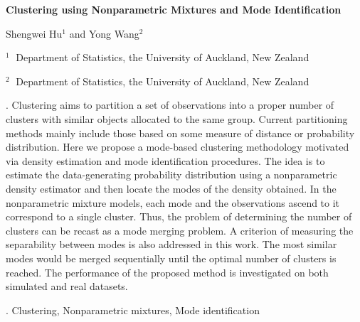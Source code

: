 \documentclass[12pt]{article}
\begin{document}
\begin{flushleft}


{\LARGE\bf Clustering using Nonparametric Mixtures and Mode Identification}


\vspace{1.0cm}

Shengwei Hu$^1$ and Yong Wang$^2$

\begin{description}

\item $^1 \;$ Department of Statistics, the University of Auckland,
New Zealand

\item $^2 \;$ Department of Statistics, the University of Auckland,
New Zealand

\end{description}

\end{flushleft}


\vspace{0.75cm}

. Clustering aims to partition a set of observations into a proper number of clusters with similar objects allocated to the same group. Current partitioning methods mainly include those based on some measure of distance or probability distribution. Here we propose a mode-based clustering methodology motivated via density estimation and mode identification procedures. The idea is to estimate the data-generating probability distribution using a nonparametric density estimator and then locate the modes of the density obtained. In the nonparametric mixture models, each mode and the observations ascend to it correspond to a single cluster. Thus, the problem of determining the number of clusters can be recast as a mode merging problem. A criterion of measuring the separability between modes is also addressed in this work. The most similar modes would be merged sequentially until the optimal number of clusters is reached. The performance of the proposed method is investigated on both simulated and real datasets.


\vskip 2mm

.
Clustering, Nonparametric mixtures, Mode identification
\end{document}
